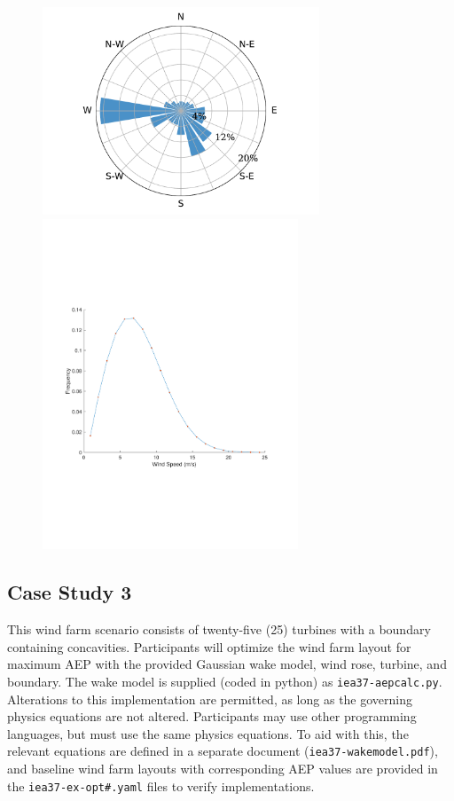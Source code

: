 \documentclass[10pt]{article}
\begin{document}
        \begin{figure}[]
            \begin{center}
            \includegraphics[width=3.25in, trim={.1in .8in 0.8in .8in},clip]{iea37-windrose.pdf}
            \includegraphics[width=3in, trim={.6in 2.72in 1in 2.4in},clip]{windspeed-freq.pdf}
            \label{fig:windrose}
            \end{center}
        \end{figure}


    \subsection{Case Study 3}

        This wind farm scenario consists of twenty-five (25) turbines with a boundary containing concavities.
        Participants will optimize the wind farm layout for maximum AEP with the provided Gaussian wake model, wind rose, turbine, and boundary.
        The wake model is supplied (coded in python) as \texttt{iea37-aepcalc.py}.
        Alterations to this implementation are permitted, as long as the governing physics equations are not altered.
        Participants may use other programming languages, but must use the same physics equations.
        To aid with this, the relevant equations are defined in a separate document (\texttt{iea37-wakemodel.pdf}), and baseline wind farm layouts with corresponding AEP values are provided in the \texttt{iea37-ex-opt\#.yaml} files to verify implementations.
    
\end{document}
